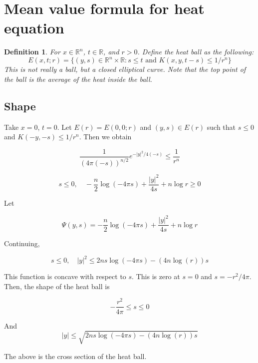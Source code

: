 \documentclass{article}
\newtheorem{definition}[theorem]{Definition}
\newtheorem{one minute paper}[theorem]{One Minute Paper}
\begin{document}
\section*{Mean value formula for heat equation}

\begin{definition}
    For $x \in \mathbb{R}^n$, $t \in \mathbb{R}$, and $r > 0$. Define the heat ball as the following:
    \begin{equation}
        E(x,t;r) = \{(y,s) \in \mathbb{R}^n \times \mathbb{R}: s \leq t \text{ and } K(x,y,t-s) \leq 1/r^n\}
    \end{equation}
    This is not really a ball, but a closed elliptical curve. Note that the top point of the ball is the average of the heat inside the ball.
\end{definition}

\subsection*{Shape}

Take $x=0$, $t=0$. Let $E(r) = E(0,0;r)$ and $(y,s) \in E(r)$ such that $s \leq 0$ and $K(-y, -s) \leq 1/r^n$. Then we obtain 

\begin{equation}
    \frac{1}{(4\pi (-s))^{n/2}}e^{-|y|^2/4(-s)} \leq \frac{1}{r^n}
\end{equation}

\begin{equation}
    s \leq 0, \quad -\frac{n}{2}\log(-4\pi s) + \frac{|y|^2}{4s} + n\log r \geq 0
\end{equation}

Let 

\begin{equation}
    \Psi(y,s) = -\frac{n}{2}\log(-4\pi s) + \frac{|y|^2}{4s} + n\log r
\end{equation}

Continuing, 

\begin{equation}
    s \leq 0, \quad |y|^2 \leq 2n s \log(-4\pi s) - (4n\log(r))s
\end{equation}

This function is concave with respect to $s$. This is zero at $s=0$ and $s= -r^2/4\pi$. Then, the shape of the heat ball is 

\begin{equation}
    -\frac{r^2}{4\pi} \leq s \leq 0 
\end{equation}

And $$|y| \leq \sqrt{2ns\log(-4\pi s) - (4n\log (r))s}$$

The above is the cross section of the heat ball. 
\end{document}
